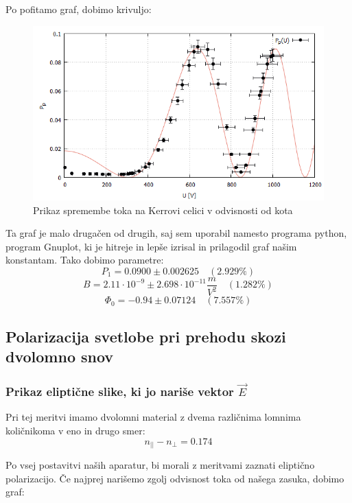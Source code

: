 \documentclass[11pt, a4paper]{article}
\theoremstyle{definition}
\theoremstyle{example}
\theoremstyle{izrek}
\begin{document}
Po pofitamo graf, dobimo krivuljo: 
\begin{figure}[H]
	\centering
    \includegraphics[width=12cm]{Izkoristek_kot,Kerrova celica.png}
    \caption{Prikaz spremembe toka na Kerrovi celici v odvisnosti od kota}
    

\end{figure}
Ta graf je malo drugačen od drugih, saj sem uporabil namesto programa python, program Gnuplot, ki je hitreje in lepše izrisal in prilagodil graf našim konstantam. 
Tako dobimo parametre: 
$$P_1= 0.0900 \pm 0.002625 \quad(2.929\%) $$ 
$$ B=2.11 \cdot 10^{-9} \pm 2.698 \cdot 10^{-11} \frac{m}{V^2} \quad (1.282\%)$$
$$\Phi_0= -0.94 \pm 0.07124 \quad (7.557\%)$$
\pagebreak
\subsection{Polarizacija svetlobe pri prehodu skozi dvolomno snov}
\subsubsection{Prikaz eliptične slike, ki jo nariše vektor $\vec{E}$}
Pri tej meritvi imamo dvolomni material z dvema različnima lomnima količnikoma v eno in drugo smer: 
\begin{equation}
\label{Lomni količniki}
n_{||}-n_{\perp}=0.174
\end{equation}

Po vsej postavitvi naših aparatur, bi morali z meritvami zaznati eliptično polarizacijo.
Če najprej narišemo zgolj odvisnost toka od našega zasuka, dobimo graf:
\end{document}
